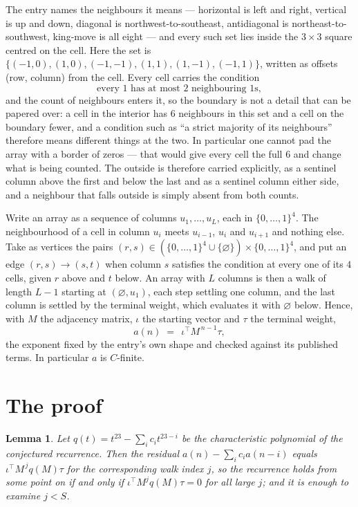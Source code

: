 \documentclass[11pt,a4paper]{article}
\theoremstyle{plain}
\newtheorem{lemma}[theorem]{Lemma}
\theoremstyle{definition}
\begin{document}
The entry names the neighbours it means --- horizontal is left and right, vertical is up and
down, diagonal is northwest-to-southeast, antidiagonal is northeast-to-southwest, king-move is
all eight --- and every such set lies inside the $3\times3$ square centred on the cell. Here
the set is $\{(-1,0), (1,0), (-1,-1), (1,1), (1,-1), (-1,1)\}$, written as offsets (row, column) from the cell. Every cell carries
the condition
\[
\text{every 1 has at most 2 neighbouring 1s},
\]
and the count of neighbours enters it, so the boundary is not a detail that can be papered
over: a cell in the interior has $6$ neighbours in this set and a cell on the boundary
fewer, and a condition such as ``a strict majority of its neighbours'' therefore means
different things at the two. In particular one cannot pad the array with a border of zeros ---
that would give every cell the full $6$ and change what is being counted. The outside is
therefore carried
explicitly, as a sentinel column above the first and below the last and as a sentinel column
either side, and a neighbour that falls outside is simply absent from both counts.

Write an array as a sequence of columns $u_1,\dots,u_L$, each in
$\{0,\dots,1\}^{4}$. The neighbourhood of a cell in column $u_i$ meets $u_{i-1}$,
$u_i$ and $u_{i+1}$ and nothing else. Take as vertices the pairs
$(r,s)\in(\{0,\dots,1\}^{4}\cup\{\varnothing\})\times\{0,\dots,1\}^{4}$,
and put an edge $(r,s)\to(s,t)$ when column $s$ satisfies the condition at every one of its
$4$ cells, given $r$ above and $t$ below. An array with $L$ columns is then a walk of length
$L-1$ starting at $(\varnothing,u_1)$, each step settling one column, and the last column is
settled by the terminal weight, which evaluates it with $\varnothing$ below. Hence,
with $M$ the adjacency matrix, $\iota$ the starting vector and $\tau$ the terminal weight,
\[
a(n)\;=\;\,\iota^{\!\top}M^{\,n-1}\tau ,
\]
the exponent fixed by the entry's own shape and checked against its published terms. In
particular $a$ is $C$-finite.

\section{The proof}

\begin{lemma}\label{lem:crit}
Let $q(t)=t^{23}-\sum_i c_it^{23-i}$ be the characteristic polynomial of the
conjectured recurrence. Then the residual $a(n)-\sum_ic_ia(n-i)$ equals
$\iota^{\!\top}M^{\,j}q(M)\tau$ for the corresponding walk index $j$, so the
recurrence holds from some point on if and only if $\iota^{\!\top}M^{j}q(M)\tau=0$ for all
large $j$; and it is enough to examine $j<S$.
\end{lemma}
\end{document}

